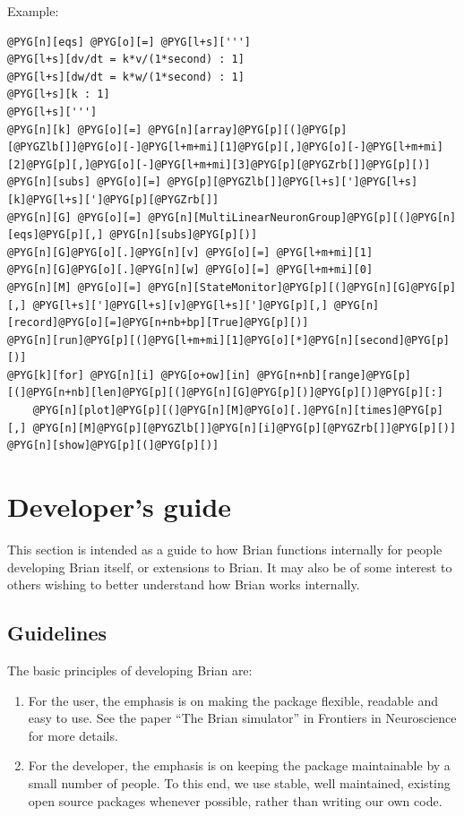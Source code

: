 \documentclass[letterpaper,10pt,english]{manual}
\begin{document}
Example:

\begin{Verbatim}[commandchars=@\[\]]
@PYG[n][eqs] @PYG[o][=] @PYG[l+s][''']
@PYG[l+s][dv/dt = k*v/(1*second) : 1]
@PYG[l+s][dw/dt = k*w/(1*second) : 1]
@PYG[l+s][k : 1]
@PYG[l+s][''']
@PYG[n][k] @PYG[o][=] @PYG[n][array]@PYG[p][(]@PYG[p][@PYGZlb[]]@PYG[o][-]@PYG[l+m+mi][1]@PYG[p][,]@PYG[o][-]@PYG[l+m+mi][2]@PYG[p][,]@PYG[o][-]@PYG[l+m+mi][3]@PYG[p][@PYGZrb[]]@PYG[p][)]
@PYG[n][subs] @PYG[o][=] @PYG[p][@PYGZlb[]]@PYG[l+s][']@PYG[l+s][k]@PYG[l+s][']@PYG[p][@PYGZrb[]]
@PYG[n][G] @PYG[o][=] @PYG[n][MultiLinearNeuronGroup]@PYG[p][(]@PYG[n][eqs]@PYG[p][,] @PYG[n][subs]@PYG[p][)]
@PYG[n][G]@PYG[o][.]@PYG[n][v] @PYG[o][=] @PYG[l+m+mi][1]
@PYG[n][G]@PYG[o][.]@PYG[n][w] @PYG[o][=] @PYG[l+m+mi][0]
@PYG[n][M] @PYG[o][=] @PYG[n][StateMonitor]@PYG[p][(]@PYG[n][G]@PYG[p][,] @PYG[l+s][']@PYG[l+s][v]@PYG[l+s][']@PYG[p][,] @PYG[n][record]@PYG[o][=]@PYG[n+nb+bp][True]@PYG[p][)]
@PYG[n][run]@PYG[p][(]@PYG[l+m+mi][1]@PYG[o][*]@PYG[n][second]@PYG[p][)]
@PYG[k][for] @PYG[n][i] @PYG[o+ow][in] @PYG[n+nb][range]@PYG[p][(]@PYG[n+nb][len]@PYG[p][(]@PYG[n][G]@PYG[p][)]@PYG[p][)]@PYG[p][:]
    @PYG[n][plot]@PYG[p][(]@PYG[n][M]@PYG[o][.]@PYG[n][times]@PYG[p][,] @PYG[n][M]@PYG[p][@PYGZlb[]]@PYG[n][i]@PYG[p][@PYGZrb[]]@PYG[p][)]
@PYG[n][show]@PYG[p][(]@PYG[p][)]
\end{Verbatim}

\resetcurrentobjects
\hypertarget{--doc-developer}{}

\chapter{Developer's guide}

This section is intended as a guide to how Brian functions internally for
people developing Brian itself, or extensions to Brian. It may also be of some
interest to others wishing to better understand how Brian works internally.

\resetcurrentobjects
\hypertarget{--doc-developer-guidelines}{}

\section{Guidelines}

The basic principles of developing Brian are:
\begin{enumerate}
\item {} 
For the user, the emphasis is on making the package flexible, readable and
easy to use. See the paper ``The Brian simulator'' in Frontiers in Neuroscience
for more details.

\item {} 
For the developer, the emphasis is on keeping the package maintainable by
a small number of people. To this end, we use stable, well maintained,
existing open source packages whenever possible, rather than writing our
own code.

\end{enumerate}
\end{document}
